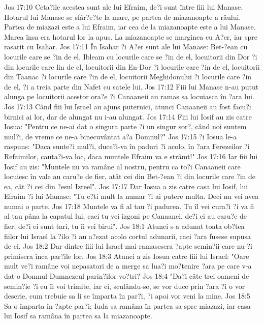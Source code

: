 Jos 17:10  Ceta?ile acestea sunt ale lui Efraim, de?i sunt între fiii lui Manase. Hotarul lui Manase se sfâr?e?te la mare, pe partea de miazanoapte a râului. Partea de miazazi este a lui Efraim, iar cea de la miazanoapte este a lui Manase. Marea însa era hotarul lor la apus. La miazanoapte se marginea cu A?er, iar spre rasarit cu Isahar.
Jos 17:11  În Isahar ?i A?er sunt ale lui Manase: Bet-?ean cu locurile care se ?in de el, Ibleam cu locurile care se ?in de el, locuitorii din Dor ?i din locurile care lin de el, locuitorii din En-Dor ?i locurile care ?in de el, locuitorii din Taanac ?i locurile care ?in de el, locuitorii Meghidonului ?i locurile care ?in de el, ?i a treia parte din Nafet cu satele lui.
Jos 17:12  Fiii lui Manase n-au putut alunga pe locuitorii acestor ora?e ?i Canaaneii au ramas sa locuiasca în ?ara lui.
Jos 17:13  Când fiii lui Israel au ajuns puternici, atunci Canaaneii au fost facu?i birnici ai lor, dar de alungat nu i-au alungat.
Jos 17:14  Fiii lui Iosif au zis catre Iosua: "Pentru ce ne-ai dat o singura parte ?i un singur sor?, când noi suntem mul?i, de vreme ce ne-a binecuvântat a?a Domnul?"
Jos 17:15  ?i Iosua le-a raspuns: "Daca sunte?i mul?i, duce?i-va în paduri ?i acolo, în ?ara Ferezeilor ?i Refaimilor, cauta?i-va loc, daca muntele Efraim va e strâmt!"
Jos 17:16  Iar fiii lui Iosif au zis: "Muntele nu va ramâne al nostru, pentru ca to?i Canaaneii care locuiesc în vale au caru?e de fier, atât cei din Bet-?ean ?i din locurile care ?in de ea, cât ?i cei din ?esul Izreel".
Jos 17:17  Dar Iosua a zis catre casa lui Iosif, lui Efraim ?i lui Manase: "Tu e?ti mult la numar ?i ai putere multa. Deci nu vei avea numai o parte.
Jos 17:18  Muntele va fi al tau ?i padurea. Tu îl vei cura?i ?i va fi al tau pâna la capatul lui, caci tu vei izgoni pe Canaanei, de?i ei au caru?e de fier; de?i ei sunt tari, tu îi vei birui".
Jos 18:1  Atunci s-a adunat toata ob?tea fiilor lui Israel la ?ilo ?i au a?ezat acolo cortul adunarii, caci ?ara fusese supusa de ei.
Jos 18:2  Dar dintre fiii lui Israel mai ramasesera ?apte semin?ii care nu-?i primisera înca par?ile lor.
Jos 18:3  Atunci a zis Iosua catre fiii lui Israel: "Oare mult ve?i ramâne voi nepasatori de a merge sa lua?i mo?tenire ?ara pe care v-a dat-o Domnul Dumnezeul parin?ilor vo?tri?
Jos 18:4  "Da?i câte trei oameni de semin?ie ?i eu îi voi trimite, iar ei, sculându-se, se vor duce prin ?ara ?i o vor descrie, cum trebuie sa li se împarta în par?i, ?i apoi vor veni la mine.
Jos 18:5  Sa o împarta în ?apte par?i; Iuda sa ramâna în partea sa spre miazazi, iar casa lui Iosif sa ramâna în partea sa la miazanoapte.
